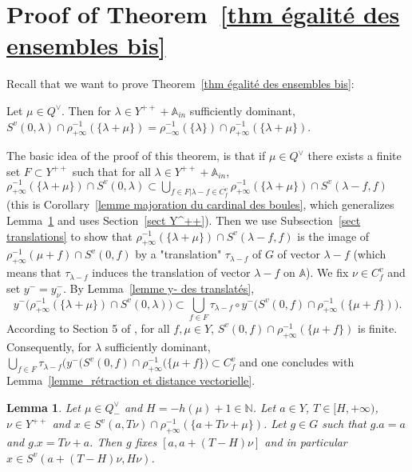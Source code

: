 \documentclass[12pt]{article}
\theoremstyle{plain}
\newtheorem{lemma}[theorem]{Lemma}
\theoremstyle{definition}
\newcommand{\A}{\mathbb{A}}
\newcommand{\N}{\mathbb{N}}
\begin{document}
\section{Proof of Theorem~\ref{thm égalité des ensembles bis}}\label{sect proof of final theorem}
Recall that we want to prove Theorem~\ref{thm égalité des ensembles bis}: 

 Let $\mu\in Q^\vee$. Then for $\lambda\in Y^{++}+\A_{in}$ sufficiently dominant, $S^v(0,\lambda)\cap \rho_{+\infty}^{-1}(\{\lambda+\mu\})=\rho_{-\infty}^{-1}(\{\lambda\})\cap\rho_{+\infty}^{-1}(\{\lambda+\mu\})$.

The basic idea of the proof of this theorem, is that if $\mu\in Q^\vee$ there exists a finite set $F\subset Y^{++}$ such that for all $\lambda\in Y^{++}+\A_{in}$, $\rho_{+\infty}^{-1}(\{\lambda+\mu\})\cap S^v(0,\lambda) \subset \bigcup_{f\in F|\lambda-f\in\overline{C^v_f}} \rho_{+\infty}^{-1}(\{\lambda+\mu\})\cap S^v(\lambda-f,f)$ (this is Corollary~\ref{lemme majoration du cardinal des boules}, which generalizes Lemma~\ref{lemme distance finie à l'appartement} and uses Section~\ref{sect Y^++}). Then we use Subsection~\ref{sect translations} to show  that $\rho_{+\infty}^{-1}(\{\lambda+\mu\})\cap S^v(\lambda-f,f)$ is the image of $\rho_{+\infty}^{-1}(\mu+f)\cap S^v(0,f)$ by a "translation" $\tau_{\lambda-f}$ of $G$ of vector $\lambda-f$ (which means that $\tau_{\lambda-f}$ induces the translation of vector $\lambda-f$ on $\mathbb{A}$). We fix $\nu\in C_f^v$ and set $y^-=y_\nu^-$. By Lemma~\ref{lemme y- des translatés},  \[y^-\big(\rho_{+\infty}^{-1}(\{\lambda+\mu\})\cap S^v(0,\lambda)\big)\subset\bigcup_{f\in F}\tau_{\lambda-f}\circ y^-\big(S^v(0,f)\cap \rho_{+\infty}^{-1}(\{\mu +f\})\big).\] According to Section 5 of \cite{gaussent2014spherical}, for all $f, \mu \in Y$, $S^v(0,f)\cap \rho_{+\infty}^{-1}(\{\mu +f\})$ is finite. Consequently, for $\lambda$ sufficiently dominant, $\bigcup_{f\in F}\tau_{\lambda-f}\big(y^-(S^v(0,f)\cap \rho_{+\infty}^{-1}(\{\mu +f\}\big)\subset C^v_f$  and one concludes with Lemma~\ref{lemme_rétraction et distance vectorielle}. 
 



\begin{lemma}\label{lemme distance finie à l'appartement}
Let $\mu\in Q^\vee_-$ and $H=-h(\mu)+1\in \N$. Let $a\in Y$, $T\in [H,+\infty)$, $\nu\in Y^{++}$ and $x\in S^v(a,T\nu)\cap\rho_{+\infty}^{-1}(\{a+T\nu+\mu\})$. Let $g\in G$ such that $g.a=a$ and $g.x=T\nu+a$. Then $g$ fixes $[a,a+(T-H)\nu]$ and in particular $x\in S^v(a+(T-H)\nu,H\nu)$.
\end{lemma}
\end{document}
